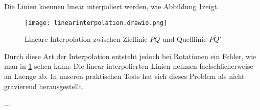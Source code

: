 Die Linien koennen linear interpoliert werden, wie Abbildung \ref{fig:linearinterpolation}zeigt. 

\begin{figure}[htbp]
	\centering
	\texttt{[image: linearinterpolation.drawio.png]}
	\caption{Lineare Interpolation zwischen Ziellinie $\overline{PQ}$ und Quelllinie $\overline{PQ'}$}
	\label{fig:linearinterpolation}
\end{figure}

Durch diese Art der Interpolation entsteht jedoch bei
Rotationen ein Fehler, wie man in \ref{fig:linearinterpolation} sehen kann: Die linear
interpolierten Linien nehmen faelschlicherweise
an Laenge ab. In unseren praktischen Tests hat sich
dieses Problem als nicht gravierend herausgestellt.



...

